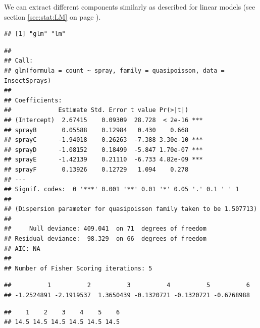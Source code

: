 \documentclass[krantz2]{krantz}\usepackage{knitr}
\begin{document}
We can extract different components similarly as described for linear models (see section \ref{sec:stat:LM} on page \pageref{sec:stat:LM}).

\begin{knitrout}\footnotesize
{}\color{fgcolor}\begin{kframe}
\begin{alltt}
\end{alltt}
\begin{verbatim}
## [1] "glm" "lm"
\end{verbatim}
\begin{alltt}
\end{alltt}
\begin{verbatim}
## 
## Call:
## glm(formula = count ~ spray, family = quasipoisson, data = InsectSprays)
## 
## Coefficients:
##             Estimate Std. Error t value Pr(>|t|)    
## (Intercept)  2.67415    0.09309  28.728  < 2e-16 ***
## sprayB       0.05588    0.12984   0.430    0.668    
## sprayC      -1.94018    0.26263  -7.388 3.30e-10 ***
## sprayD      -1.08152    0.18499  -5.847 1.70e-07 ***
## sprayE      -1.42139    0.21110  -6.733 4.82e-09 ***
## sprayF       0.13926    0.12729   1.094    0.278    
## ---
## Signif. codes:  0 '***' 0.001 '**' 0.01 '*' 0.05 '.' 0.1 ' ' 1
## 
## (Dispersion parameter for quasipoisson family taken to be 1.507713)
## 
##     Null deviance: 409.041  on 71  degrees of freedom
## Residual deviance:  98.329  on 66  degrees of freedom
## AIC: NA
## 
## Number of Fisher Scoring iterations: 5
\end{verbatim}
\begin{alltt}
\hlstd{(}
\end{alltt}
\begin{verbatim}
##          1          2          3          4          5          6 
## -1.2524891 -2.1919537  1.3650439 -0.1320721 -0.1320721 -0.6768988
\end{verbatim}
\begin{alltt}
\hlstd{(}
\end{alltt}
\begin{verbatim}
##    1    2    3    4    5    6 
## 14.5 14.5 14.5 14.5 14.5 14.5
\end{verbatim}
\end{kframe}
\end{knitrout}
\end{document}
